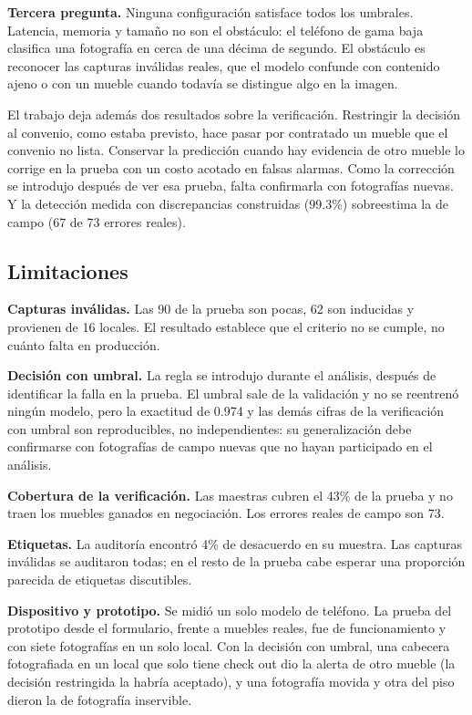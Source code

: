 \documentclass[conference]{IEEEtran}
\begin{document}
\textbf{Tercera pregunta.} Ninguna configuración satisface todos los umbrales. Latencia, memoria y tamaño no son
el obstáculo: el teléfono de gama baja clasifica una fotografía en cerca de una décima de segundo. El obstáculo es reconocer
las capturas inválidas reales, que el modelo confunde con contenido ajeno o con un mueble cuando todavía se
distingue algo en la imagen.

El trabajo deja además dos resultados sobre la verificación. Restringir la decisión al convenio, como estaba
previsto, hace pasar por contratado un mueble que el convenio no lista. Conservar la predicción cuando hay
evidencia de otro mueble lo corrige en la prueba con un costo acotado en falsas alarmas. Como la corrección se
introdujo después de ver esa prueba, falta confirmarla con fotografías nuevas. Y la detección medida con discrepancias
construidas (99.3\%) sobreestima la de campo (67 de 73 errores reales).

\subsection{Limitaciones}

\textbf{Capturas inválidas.} Las 90 de la prueba son pocas, 62 son inducidas y provienen de 16 locales. El
resultado establece que el criterio no se cumple, no cuánto falta en producción.

\textbf{Decisión con umbral.} La regla se introdujo durante el análisis, después de identificar la falla en la
prueba. El umbral sale de la validación y no se reentrenó ningún modelo, pero la exactitud de 0.974 y las demás
cifras de la verificación con umbral son reproducibles, no independientes: su generalización debe confirmarse con
fotografías de campo nuevas que no hayan participado en el análisis.

\textbf{Cobertura de la verificación.} Las maestras cubren el 43\% de la prueba y no traen los muebles ganados
en negociación. Los errores reales de campo son 73.

\textbf{Etiquetas.} La auditoría encontró 4\% de desacuerdo en su muestra. Las capturas inválidas se auditaron
todas; en el resto de la prueba cabe esperar una proporción parecida de etiquetas discutibles.

\textbf{Dispositivo y prototipo.} Se midió un solo modelo de teléfono. La prueba del prototipo desde el formulario,
frente a muebles reales, fue de funcionamiento y con siete fotografías en un solo local. Con la decisión con
umbral, una cabecera fotografiada en un local que solo tiene check out dio la alerta de otro mueble (la decisión
restringida la habría aceptado), y una fotografía movida y otra del piso dieron la de fotografía inservible.
\end{document}
